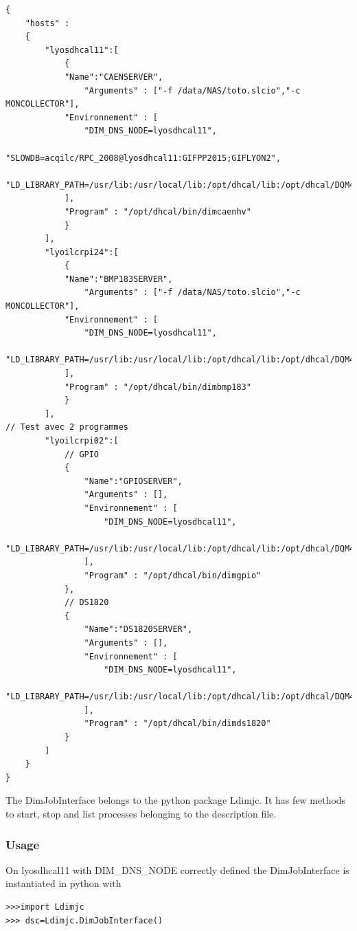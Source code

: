 \documentclass[english]{article}
\begin{document}
\begin{verbatim}
{
    "hosts" :
    {
        "lyosdhcal11":[
            {
            "Name":"CAENSERVER",
                "Arguments" : ["-f /data/NAS/toto.slcio","-c MONCOLLECTOR"],
            "Environnement" : [
                "DIM_DNS_NODE=lyosdhcal11",
                "SLOWDB=acqilc/RPC_2008@lyosdhcal11:GIFPP2015;GIFLYON2",
                "LD_LIBRARY_PATH=/usr/lib:/usr/local/lib:/opt/dhcal/lib:/opt/dhcal/DQM4HEP/lib:/opt/dhcal/dim/linux:$LD_LIBRARY_PATH"
            ],
            "Program" : "/opt/dhcal/bin/dimcaenhv"
            }         
        ],
        "lyoilcrpi24":[
            {
            "Name":"BMP183SERVER",
                "Arguments" : ["-f /data/NAS/toto.slcio","-c MONCOLLECTOR"],
            "Environnement" : [
                "DIM_DNS_NODE=lyosdhcal11",
                "LD_LIBRARY_PATH=/usr/lib:/usr/local/lib:/opt/dhcal/lib:/opt/dhcal/DQM4HEP/lib:/opt/dhcal/dim/linux:$LD_LIBRARY_PATH"
            ],
            "Program" : "/opt/dhcal/bin/dimbmp183"
            }         
        ],
// Test avec 2 programmes
        "lyoilcrpi02":[
            // GPIO
            {
                "Name":"GPIOSERVER",
                "Arguments" : [],
                "Environnement" : [
                    "DIM_DNS_NODE=lyosdhcal11",
                    "LD_LIBRARY_PATH=/usr/lib:/usr/local/lib:/opt/dhcal/lib:/opt/dhcal/DQM4HEP/lib:/opt/dhcal/dim/linux:$LD_LIBRARY_PATH"
                ],
                "Program" : "/opt/dhcal/bin/dimgpio"
            },
            // DS1820
            {
                "Name":"DS1820SERVER",
                "Arguments" : [],
                "Environnement" : [
                    "DIM_DNS_NODE=lyosdhcal11",
                    "LD_LIBRARY_PATH=/usr/lib:/usr/local/lib:/opt/dhcal/lib:/opt/dhcal/DQM4HEP/lib:/opt/dhcal/dim/linux:$LD_LIBRARY_PATH"
                ],
                "Program" : "/opt/dhcal/bin/dimds1820"
            }          
        ]
    }
}

\end{verbatim}

The DimJobInterface belongs to the python package Ldimjc. It has few methods to start, stop and list processes belonging to the description file.
\subsubsection{Usage}
On lyosdhcal11 with DIM\_DNS\_NODE correctly defined the DimJobInterface is instantiated in python with
\begin{verbatim}
>>>import Ldimjc
>>> dsc=Ldimjc.DimJobInterface()
\end{verbatim}
\end{document}
